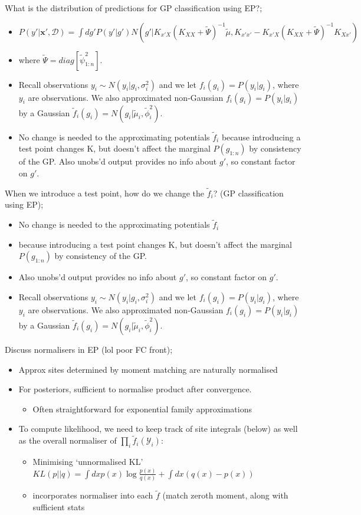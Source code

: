 \documentclass{article}
\begin{document}
What is the distribution of predictions for GP classification using EP?; \begin{itemize} \item $P(y'|\mathbf{x'}, \mathcal{D}) = \int dg' P(y'|g')N(g' | K_{x'X}(K_{XX}+\tilde{\Psi})^{-1}\tilde{\mu}, K_{x'x'} - K_{x'X}(K_{XX}+\tilde{\Psi})^{-1}K_{Xx'})$ \item where $\tilde{\Psi} = diag[\tilde{\psi}^2_{1:n}]$. \item Recall observations $y_i \sim N(y_i | g_i, \sigma^2_i)$ and we let $f_i(g_i) = P(y_i|g_i)$, where $y_i$ are observations. We also approximated non-Gaussian $f_i(g_i) = P(y_i|g_i)$ by a Gaussian $\tilde{f}_i(g_i) = N(g_i | \tilde{\mu}_i, \tilde{\phi}^2_i)$. \item No change is needed to the approximating potentials $\tilde{f}_i$ because introducing a test point changes K, but doesn't affect the marginal $P(g_{1:n})$ by consistency of the GP. Also unobs'd output provides no info about $g'$, so constant factor on $g'$. \end{itemize}

When we introduce a test point, how do we change the $\tilde{f}_i$? (GP classification using EP); \begin{itemize} \item No change is needed to the approximating potentials $\tilde{f}_i$  \item because introducing a test point changes K, but doesn't affect the marginal $P(g_{1:n})$ by consistency of the GP. \item Also unobs'd output provides no info about $g'$, so constant factor on $g'$. \item Recall observations $y_i \sim N(y_i | g_i, \sigma^2_i)$ and we let $f_i(g_i) = P(y_i|g_i)$, where $y_i$ are observations. We also approximated non-Gaussian $f_i(g_i) = P(y_i|g_i)$ by a Gaussian $\tilde{f}_i(g_i) = N(g_i | \tilde{\mu}_i, \tilde{\phi}^2_i)$. \end{itemize}


Discuss normalisers in EP (lol poor FC front); \begin{itemize} \item Approx sites determined by moment matching are naturally normalised \item For posteriors, sufficient to normalise product after convergence. \begin{itemize} \item Often straightforward for exponential family approximations \end{itemize} \item To compute likelihood, we need to keep track of site integrals (below) as well as the overall normaliser of $\prod_i\tilde{f}_i(\mathcal{Y}_i)$: \begin{itemize} \item Minimising `unnormalised KL' $KL(p||q) = \int dx p(x)\log \frac{p(x)}{q(x)} + \int dx (q(x) - p(x))$ \item incorporates normaliser into each $\tilde{f}$ (match zeroth moment, along with sufficient stats \end{itemize} \end{itemize}
\end{document}
